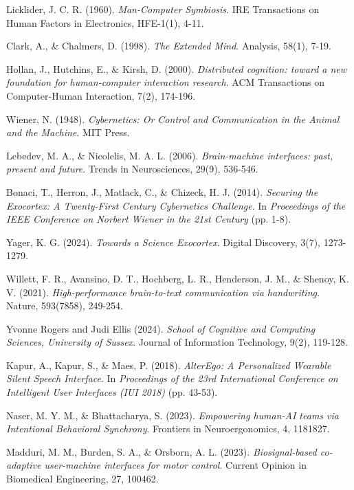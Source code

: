 \documentclass[11pt]{article}
\begin{document}
\begin{thebibliography}{99}

 Licklider, J. C. R. (1960). \textit{Man-Computer Symbiosis}. IRE Transactions on Human Factors in Electronics, HFE-1(1), 4-11.

 Clark, A., \& Chalmers, D. (1998). \textit{The Extended Mind}. Analysis, 58(1), 7-19.

 Hollan, J., Hutchins, E., \& Kirsh, D. (2000). \textit{Distributed cognition: toward a new foundation for human-computer interaction research}. ACM Transactions on Computer-Human Interaction, 7(2), 174-196.


 Wiener, N. (1948). \textit{Cybernetics: Or Control and Communication in the Animal and the Machine}. MIT Press.

 Lebedev, M. A., \& Nicolelis, M. A. L. (2006). \textit{Brain-machine interfaces: past, present and future}. Trends in Neurosciences, 29(9), 536-546.

 Bonaci, T., Herron, J., Matlack, C., \& Chizeck, H. J. (2014). \textit{Securing the Exocortex: A Twenty-First Century Cybernetics Challenge}. In \textit{Proceedings of the IEEE Conference on Norbert Wiener in the 21st Century} (pp. 1-8).

 Yager, K. G. (2024). \textit{Towards a Science Exocortex}. Digital Discovery, 3(7), 1273-1279.

 Willett, F. R., Avansino, D. T., Hochberg, L. R., Henderson, J. M., \& Shenoy, K. V. (2021). \textit{High-performance brain-to-text communication via handwriting}. Nature, 593(7858), 249-254.

 Yvonne Rogers and Judi Ellis (2024). \textit{School of Cognitive and Computing Sciences, University of Sussex}. Journal of Information Technology, 9(2), 119-128.

 Kapur, A., Kapur, S., \& Maes, P. (2018). \textit{AlterEgo: A Personalized Wearable Silent Speech Interface}. In \textit{Proceedings of the 23rd International Conference on Intelligent User Interfaces (IUI 2018)} (pp. 43-53).

 Naser, M. Y. M., \& Bhattacharya, S. (2023). \textit{Empowering human-AI teams via Intentional Behavioral Synchrony}. Frontiers in Neuroergonomics, 4, 1181827.

 Madduri, M. M., Burden, S. A., \& Orsborn, A. L. (2023). \textit{Biosignal-based co-adaptive user-machine interfaces for motor control}. Current Opinion in Biomedical Engineering, 27, 100462.


\end{thebibliography}
\end{document}
